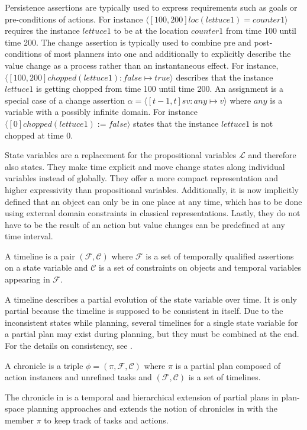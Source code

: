 Persistence assertions are typically used to express requirements such as goals or pre-conditions of actions.
For instance $\langle[100,200] loc(lettuce1) = counter1\rangle$ requires the instance $lettuce1$ to be at the location $counter1$ from time 100 until time 200.
The change assertion is typically used to combine pre and post-conditions of most planners into one and additionally to explicitly describe the value change as a process rather than an instantaneous effect.
For instance, $\langle [100,200] chopped(lettuce1) : false \mapsto true \rangle$ describes that the instance $lettuce1$ is getting chopped from time 100 until time 200.
An assignment is a special case of a change assertion $\alpha = \langle [t-1,t] sv: any \mapsto v \rangle$ where $any$ is a variable with a possibly infinite domain.
For instance $\langle [0] chopped(lettuce1) := false \rangle$ states that the instance $lettuce1$ is not chopped at time 0.

State variables are a replacement for the propositional variables $\mathcal{L}$ and therefore also states.
They make time explicit and move change states along individual variables instead of globally.
They offer a more compact representation and higher expressivity than propositional variables.
Additionally, it is now implicitly defined that an object can only be in one place at any time, which has to be done using external domain constraints in classical representations. 
Lastly, they do not have to be the result of an action but value changes can be predefined at any time interval.

\begin{definition}[Timeline]
  A timeline is a pair $(\mathcal{F},\mathcal{C})$ where $\mathcal{F}$ is a set of temporally qualified assertions on a state variable and $\mathcal{C}$ is a set of constraints on objects and temporal variables appearing in $\mathcal{F}$.
\end{definition}
A timeline describes a partial evolution of the state variable over time.
It is only partial because the timeline is supposed to be consistent in itself.
Due to the inconsistent states while planning, several timelines for a single state variable for a partial plan may exist during planning, but they must be combined at the end.
For the details on consistency, see \cite{bit-monnotTemporalHierarchicalModels2016a}.


\begin{definition}[Chronicle]
  A chronicle is a triple $\phi = (\pi,\mathcal{F},\mathcal{C})$ where $\pi$ is a partial plan composed of action instances and unrefined tasks and $(\mathcal{F},\mathcal{C})$ is a set of timelines.
\end{definition}
The chronicle in \cite{bit-monnotFAPEConstraintbasedPlanner2020} is a temporal and hierarchical extension of partial plans in plan-space planning approaches \citep[chap.~5]{ghallabAutomatedPlanningTheory2004} and extends the notion of chronicles in \cite[sec.~4.2.4]{ghallabAutomatedPlanningActing2016} with the member $\pi$ to keep track of tasks and actions.

